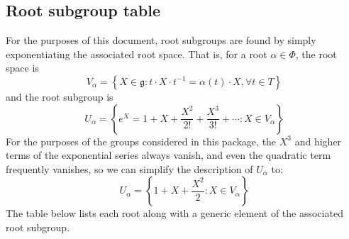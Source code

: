 \documentclass[11pt]{article}
\newcommand{\noi}{\noindent}
\newcommand{\inv}{^{-1}}
\newcommand{\lb}{\left\{}
\newcommand{\rb}{\right\}}
\newcommand{\frakg}{\mathfrak{g}}
\theoremstyle{definition}
\begin{document}
\subsection{Root subgroup table}

\noi For the purposes of this document, root subgroups are found by simply exponentiating the associated root space. That is, for a root $\alpha \in \Phi$, the root space is
\[
	V_\alpha = \lb X \in \frakg : t \cdot X \cdot t \inv = \alpha(t) \cdot X, \forall t \in T \rb
\]
and the root subgroup is
\[
	U_\alpha = \lb e^X = 1 + X + \frac{X^2}{2!} + \frac{X^3}{3!} + \cdots : X \in V_\alpha \rb
\]
For the purposes of the groups considered in this package, the $X^3$ and higher terms of the exponential series always vanish, and even the quadratic term frequently vanishes, so we can simplify the description of $U_\alpha$ to:
\[
	U_\alpha = \lb 1 + X + \frac{X^2}{2} : X \in V_\alpha \rb
\]
The table below lists each root along with a generic element of the associated root subgroup.
\end{document}
